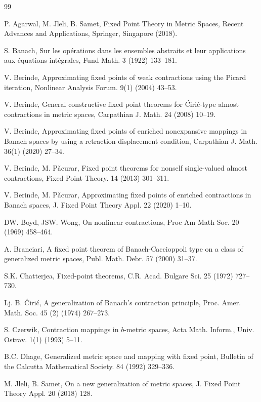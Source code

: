\documentclass[letterpaper,12pt]{article}
\numberwithin{equation}{section}
\theoremstyle{definition}
\theoremstyle{remark}
\begin{document}
\begin{thebibliography}{99}

P. Agarwal, M. Jleli, B. Samet, Fixed Point Theory in Metric Spaces, Recent Advances and Applications, Springer, Singapore (2018).


S. Banach,  Sur les op\'erations dans les ensembles abstraits et leur applications aux \'equations int\'egrales, Fund Math. 3 (1922) 133--181.

V. Berinde, Approximating fixed points of weak contractions using the Picard iteration, Nonlinear Analysis Forum. 9(1) (2004) 43--53.

V. Berinde, General constructive fixed point theorems for \'Ciri\'c-type almost
contractions in metric spaces, Carpathian J. Math. 24 (2008) 10--19.

V. Berinde, Approximating fixed points of enriched nonexpansive mappings in Banach spaces by using a retraction-displacement condition, Carpathian J. Math. 36(1) (2020) 27--34.


V. Berinde, M. P\v{a}curar, Fixed point theorems for nonself single-valued almost contractions, Fixed Point Theory. 14 (2013) 301--311.



V. Berinde,  M. P\v{a}curar,  Approximating fixed points of enriched contractions in Banach spaces, J. Fixed Point Theory Appl. 22 (2020) 1--10.


DW. Boyd, JSW. Wong,  On nonlinear contractions, Proc Am Math Soc. 20 (1969) 458--464. 


A. Branciari, A fixed point theorem of Banach-Caccioppoli type on a class of generalized metric spaces, Publ. Math. Debr. 57 (2000) 31--37.

S.K. Chatterjea,  Fixed-point theorems, C.R. Acad. Bulgare Sci. 25 (1972) 727--730.


Lj. B. \'Ciri\'c, A generalization of Banach's contraction principle, Proc. Amer. Math. Soc. 45 (2) (1974) 267--273.

S. Czerwik, Contraction mappings in  $b$-metric spaces, Acta Math. Inform., Univ. Ostrav. 1(1) (1993) 5--11.

B.C. Dhage, Generalized metric space and mapping with fixed point, Bulletin of the Calcutta Mathematical Society.  84 (1992) 329--336.

M. Jleli, B. Samet,  On a new generalization of metric spaces, J. Fixed Point Theory Appl. 
20 (2018) 128. 



\end{thebibliography}
\end{document}
